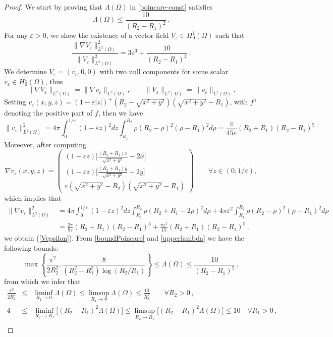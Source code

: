 \documentclass[a4paper,11pt]{amsart}
\numberwithin{equation}{section}
\numberwithin{figure}{section}
\newcommand{\eps}{\varepsilon}
\def\eq#1{(\ref{#1})}
\def\neweq#1{\begin{equation}\label{#1}}
\def\endeq{\end{equation}}
\begin{document}
\begin{proof} We start by proving that $\Lambda(\Omega)$ in \eqref{poincare-const} satisfies
	\begin{equation}\label{upperlambda}
		\Lambda(\Omega)\le\frac{10}{(R_2-R_1)^2}\, .
	\end{equation}
	For any $\eps>0$, we show the existence of a vector field $V_\eps\in H^1_0(\Omega)$ such that
	\neweq{Vepsilon}
	\frac{\|\nabla V_\eps\|_{L^2(\Omega)}^2}{\|V_\eps\|_{L^2(\Omega)}^2}=3\eps^3+\frac{10}{(R_2-R_1)^2}\, .
	\endeq
	We determine $V_\eps=(v_\eps,0,0)$ with two null components for some scalar $v_\eps\in H^1_0(\Omega)$, thus
	$$\|\nabla V_\eps\|_{L^2(\Omega)}=\|\nabla v_\eps\|_{L^2(\Omega)},\qquad\|V_\eps\|_{L^2(\Omega)}=\|v_\eps\|_{L^2(\Omega)}.$$
	Setting $v_\eps(x,y,z)=(1-\eps|z|)^+(R_2-\sqrt{x^2+y^2})(\sqrt{x^2+y^2}-R_1)$, with $f^+$ denoting the positive part of $f$, then we have
	$$
	\|v_\eps\|_{L^2(\Omega)}^2=4\pi\int_{0}^{1/\eps}(1-\eps z)^2dz
	\int_{R_1}^{R_2}\rho(R_2-\rho)^2(\rho-R_1)^2d\rho=\frac{\pi}{45\eps}(R_2+R_1)(R_2-R_1)^5\, .
	$$
	Moreover, after computing
	$$
	\nabla v_\eps (x,y,z)=\left(\begin{array}{ccc}
		(1-\eps z)\Big[\tfrac{(R_2+R_1)x}{\sqrt{x^2+y^2}}-2x\Big]\\
		(1-\eps z)\Big[\tfrac{(R_2+R_1)y}{\sqrt{x^2+y^2}}-2y\Big]\\
		\eps(\sqrt{x^2+y^2}-R_2)(\sqrt{x^2+y^2}-R_1)
	\end{array}\right)\qquad\forall z\in(0,1/\eps),
	$$which implies that
	\begin{align*}
		\|\nabla v_\eps\|^2_{L^2(\Omega)} &=
		4\pi\int_{0}^{1/\eps}(1-\eps z)^2dz\int_{R_1}^{R_2}\rho(R_2+R_1-2\rho)^2d\rho+4\pi\eps^2\int_{R_1}^{R_2}\rho(R_2-\rho)^2(\rho-R_1)^2d\rho\\
		&= \frac{2\pi}{9\eps}(R_2+R_1)(R_2-R_1)^3+\frac{\pi\eps^2}{15}(R_2+R_1)(R_2-R_1)^5\, ,
	\end{align*}
	we obtain \eq{Vepsilon}.
	From \eqref{boundPoincare} and \eqref{upperlambda} we have the following bounds:
	$$
	\max\left\{\frac{\pi^2}{2R_2^2},\frac{8}{(R_2^2 - R_1^2)\log (R_2/R_1)} \right\}\le\Lambda(\Omega)\le\frac{10}{(R_2-R_1)^2}\, ,
	$$
	from which we infer that
	\begin{eqnarray}
		\frac{\pi^2}{2R_2^2} &\le& \liminf_{R_1\to0}\Lambda(\Omega)\le\limsup_{R_1\to0}\Lambda(\Omega)\le\frac{10}{R_2^2}\qquad\forall R_2 >0\, , \label{asymp1}\\[5pt]
		4 &\le&\liminf_{R_2\to R_1}\big[(R_2-R_1)^2\Lambda(\Omega)\big]\le\limsup_{R_2\to R_1}\big[(R_2-R_1)^2\Lambda(\Omega)\big]\le10\quad\forall R_1>0 \,, \label{asymp3}\\[5pt]

\end{eqnarray}
\end{proof}
\end{document}
